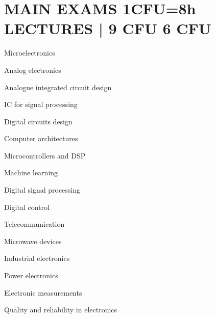 \newcommand{\redminus}{\textcolor{matred}{\faMinus}}
\newcommand{\blueminus}{\textcolor{matblue}{\faMinus}}

\section*{MAIN EXAMS
            \hfill
            1CFU=8h LECTURES \hspace{1mm} | \hspace{1mm} 
            \textcolor{matred}{\faMinus \hspace{1mm} 9 CFU}
            \textcolor{matblue}{\faMinus \hspace{1mm} 6 CFU}
            }
\begin{minipage}[t]{0.4\textwidth}
    \begin{description}[leftmargin=5mm]
        \item[\redminus] Microelectronics
        \item[\redminus] Analog electronics
        \item[\blueminus] Analogue integrated circuit design
        \item[\redminus] IC for signal processing
        \item[\redminus] Digital circuits design
        \item[\redminus] Computer architectures
        \item[\blueminus] Microcontrollers and DSP
        \item[\blueminus] Machine learning
    \end{description}
\end{minipage}
\hfill
\begin{minipage}[t]{0.4\textwidth}
    \begin{description}[leftmargin=5mm]
        \item[\blueminus] Digital signal processing
        \item[\blueminus] Digital control
        \item[\redminus] Telecommunication
        \item[\redminus] Microwave devices
        \item[\redminus] Industrial electronics 
        \item[\redminus] Power electronics
        \item[\redminus] Electronic measurements
        \item[\redminus] Quality and reliability in electronics
    \end{description}
\end{minipage}